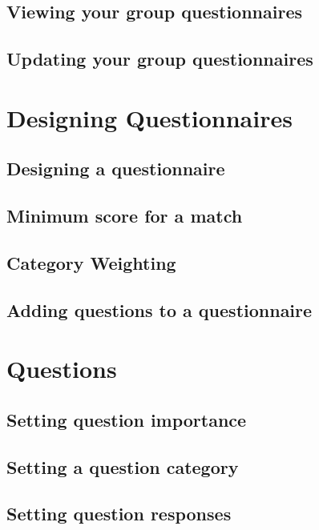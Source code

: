 \documentclass[a4paper,11pt,titlepage]{scrartcl}
\begin{document}
\subsection{Viewing your group questionnaires}

\subsection{Updating your group questionnaires}

\clearpage
\section{Designing Questionnaires}

\subsection{Designing a questionnaire}

\subsection{Minimum score for a match}

\subsection{Category Weighting}

\subsection{Adding questions to a questionnaire}

\clearpage
\section{Questions}

\subsection{Setting question importance}

\subsection{Setting a question category}

\subsection{Setting question responses}
\end{document}
